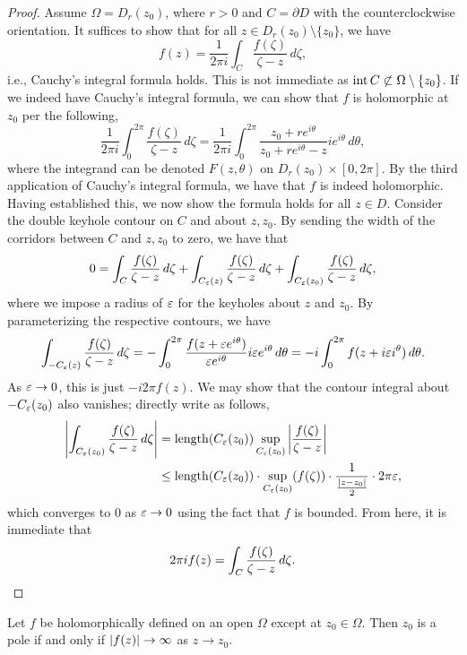 \begin{proof}
    Assume $\Omega = D_r(z_0)$, where $r > 0$ and $C = \partial D$ with the counterclockwise orientation. It suffices to show that for all $z \in D_r(z_0) \setminus \{z_0\}$, we have
    \[ f(z) = \frac{1}{2\pi i} \int_C \frac{f(\zeta)}{\zeta - z} \, d\zeta, \]
    i.e., Cauchy's integral formula holds. This is not immediate as $\operatorname{int} C \not\subset \Omega \setminus \{z_0\}$. If we indeed have Cauchy's integral formula, we can show that $f$ is holomorphic at $z_0$ per the following,
    \[ \frac{1}{2\pi i} \int_0^{2\pi} \frac{f(\zeta)}{\zeta - z} \, d\zeta = \frac{1}{2\pi i} \int_0^{2\pi} \frac{z_0 + re^{i\theta}}{z_0 + re^{i\theta} - z} i e^{i \theta} \, d\theta, \]
    where the integrand can be denoted $F(z, \theta)$ on $D_r(z_0) \times [0, 2\pi]$. By the third application of Cauchy's integral formula, we have that $f$ is indeed holomorphic. Having established this, we now show the formula holds for all $z \in D$. Consider the double keyhole contour on $C$ and about $z, z_0$. By sending the width of the corridors between $C$ and $z, z_0$ to zero, we have that
    \[ 0 = \int_C \frac{f(\zeta)}{\zeta - z} \, d\zeta + \int_{C_\varepsilon(z)} \frac{f(\zeta)}{\zeta - z} \, d\zeta + \int_{C_\varepsilon(z_0)} \frac{f(\zeta)}{\zeta - z} \, d\zeta, \]
    where we impose a radius of $\varepsilon$ for the keyholes about $z$ and $z_0$. By parameterizing the respective contours, we have
    \[ \int_{-C_\varepsilon(z)} \frac{f(\zeta)}{\zeta - z} \, d\zeta = - \int_0^{2\pi} \frac{f(z + \varepsilon e^{i\theta})}{\varepsilon e^{i \theta}} i \varepsilon e^{i \theta} \, d\theta = -i \int_0^{2\pi} f(z + i \varepsilon i^\theta) \, d\theta. \]
    As $\varepsilon \to 0$, this is just $-i 2\pi f(z)$. We may show that the contour integral about $-C_\varepsilon(z_0)$ also vanishes; directly write as follows,
    \begin{align*}
        \left\lvert \int_{C_\varepsilon(z_0)} \frac{f(\zeta)}{\zeta - z} \, d\zeta \right\rvert &= \operatorname{length}(C_\varepsilon(z_0)) \sup_{C_\varepsilon(z_0)} \left\lvert \frac{f(\zeta)}{\zeta - z} \right\rvert \\
        &\leq \operatorname{length}(C_\varepsilon(z_0)) \cdot \sup_{C_\varepsilon(z_0)} (f(\zeta)) \cdot \frac{1}{\frac{\left\lvert z - z_0 \right\rvert}{2}} \cdot 2 \pi \varepsilon,
    \end{align*}
    which converges to $0$ as $\varepsilon \to 0$ using the fact that $f$ is bounded. From here, it is immediate that
    \[ 2 \pi i f(z) = \int_C \frac{f(\zeta)}{\zeta - z} \, d\zeta. \qedhere \]
\end{proof}
\begin{corollary}[\S 3.3.2]
    Let $f$ be holomorphically defined on an open $\Omega$ except at $z_0 \in \Omega$. Then $z_0$ is a pole if and only if $\left\lvert f(z) \right\rvert \to \infty$ as $z \to z_0$.
\end{corollary}
